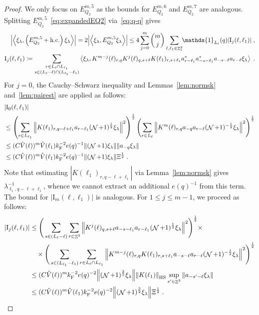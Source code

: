 \documentclass[12pt,a4paper]{article}
\numberwithin{equation}{section}
\newcommand{\1}{\mathbb{I}}
\newcommand{\F}{\mathrm{F}}
\newcommand{\HS}{\mathrm{HS}}
\newcommand{\I}{\mathrm{I}}
\DeclareMathOperator{\Z}{\mathbb{Z}}
\DeclareMathOperator{\NN}{\mathcal{N}}
\newcommand{\half}{\frac{1}{2}}
\newcommand{\eva}[1]{\left\langle #1 \right\rangle}
\theoremstyle{plain}
\theoremstyle{definition}
\theoremstyle{remark}
\theoremstyle{plain}
\theoremstyle{definition}
\theoremstyle{remark}
\begin{document}
\begin{proof}
We only focus on $ E^{m,5}_{Q_2} $ as the bounds for $ E^{m,6}_{Q_2} $ and $ E^{m,7}_{Q_2} $ are analogous. Splitting $ E^{m,5}_{Q_2} $~\eqref{eq:expandedEQ2} via~\eqref{eq:q-q} gives
\begin{equation} \label{eq:EQ2131}
\begin{aligned}
	\abs{\eva{\xi_\lambda,\left(E^{m,5}_{Q_2}+\mathrm{h.c.}\right) \xi_\lambda }} 
	= 2\abs{\eva{\xi_\lambda, E^{m,5}_{Q_2} \xi_\lambda }}
	\le 4 \sum_{j=0}^m {{m}\choose j} \sum_{\ell,\ell_1  \in \Z^3_*}\!\! \mathds{1}_{L_\ell}(q) |\I_j(\ell, \ell_1)| \;,\\
	\I_j(\ell, \ell_1)
	\coloneq \sum_{\substack{r\in L_{\ell} \cap L_{\ell_1}\\ s \in (L_{\ell} - \ell) \cap (L_{\ell_1} - \ell_1)}}
		\eva{\xi_\lambda, K^{m-j}(\ell)_{r,q} K^{j}(\ell)_{q,s+\ell} K(\ell_1)_{r,s+\ell_1} a^*_{r-\ell_1} a^*_{-s-\ell_1} a_{-s-\ell} a_{r-\ell} \xi_\lambda} \;. \\
\end{aligned}
\end{equation}
For $ j = 0 $, the Cauchy--Schwarz inequality and Lemmas~\ref{lem:normsk} and~\ref{lem:pairest} are applied as follows:
\begin{align}
	&|\I_0(\ell, \ell_1)| \nonumber\\
	&\leq \left(\sum_{r\in L_{\ell_1}} \norm{ K(\ell_1)_{r,q-\ell+\ell_1} a_{r-\ell_1}(\NN+1)^{\half} \xi_\lambda}^2\right)^\half
		\left(\sum_{r\in L_{\ell}} \norm{ K^m(\ell)_{r,q} a_{-q}a_{r-\ell} (\NN+1)^{-\half} \xi_\lambda }^2 \right)^\half \nonumber\\
	&\leq (C \hat{V}(\ell))^m \hat{V}(\ell_1) k_{\F}^{-2} e(q)^{-1} \norm{ (\NN+1) \xi_\lambda} \norm{ a_{-q} \xi_\lambda } \nonumber \\
	&\leq (C \hat{V}(\ell))^m
		\hat{V}(\ell_1)
		k_{\F}^{-2} e(q)^{-1}
		\norm{ (\NN+1) \xi_\lambda} \Xi^{\half} \;.
\end{align}
Note that estimating $ |K(\ell_1)_{r,q-\ell+\ell_1}| $ via Lemma~\ref{lem:normsk} gives $ \lambda_{\ell_1,q-\ell+\ell_1}^{-1} $, whence we cannot extract an additional $ e(q)^{-1} $ from this term.
The bound for $ |\I_m(\ell, \ell_1)| $ is analogous. For $ 1 \le j \le m-1 $, we proceed as follows:
\begin{align}
	|\I_j(\ell, \ell_1)|
	&\leq \Bigg( \sum_{ s \in (L_{\ell}-\ell) } \sum_{r\in \Z^3} \norm{ K^{j}(\ell)_{q,s+\ell} a_{-s-\ell_1} a_{r-\ell_1} (\NN+1)^{\half} \xi_\lambda}^2\Bigg)^\half\nonumber \times \\
		&\quad \times\Bigg( \sum_{ s \in (L_{\ell_1}-\ell_1)} \sum_{ r\in L_{\ell} \cap L_{\ell_1}}
		\norm{ K^{m-j}(\ell)_{r,q} K(\ell_1)_{r,s+\ell_1} a_{-s-\ell}a_{r-\ell} (\NN+1)^{-\half} \xi_\lambda }^2\Bigg)^\half \nonumber\\
	&\leq (C \hat{V}(\ell))^m k_{\F}^{-2} e(q)^{-2} 
		\norm{(\NN+1)^{\frac 32} \xi_\lambda}
		\norm{K(\ell_1)}_{\HS}
		\sup_{s' \in \Z^3} \norm{ a_{-s'-\ell} \xi_\lambda } \nonumber \\
	&\leq (C \hat{V}(\ell))^m \hat{V}(\ell_1) k_{\F}^{-2} e(q)^{-2}
		\norm{(\NN+1)^{\frac 32} \xi_\lambda} \Xi^{\half} \;.
\end{align} 
\end{proof}
\end{document}
